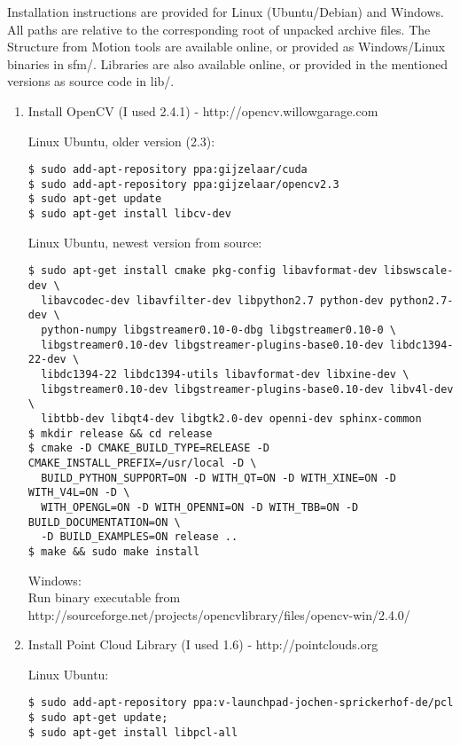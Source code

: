 Installation instructions are provided for Linux (Ubuntu/Debian) and Windows. All paths are relative to the corresponding root of unpacked archive files. The Structure from Motion tools are available online, or provided as Windows/Linux binaries in sfm/. Libraries are also available online, or provided in the mentioned versions as source code in lib/.

\begin{enumerate}
\item Install OpenCV (I used 2.4.1) - http://opencv.willowgarage.com

    Linux Ubuntu, older version (2.3):
    \begin{verbatim}
$ sudo add-apt-repository ppa:gijzelaar/cuda
$ sudo add-apt-repository ppa:gijzelaar/opencv2.3
$ sudo apt-get update
$ sudo apt-get install libcv-dev
    \end{verbatim}

    Linux Ubuntu, newest version from source:
    \begin{verbatim}
$ sudo apt-get install cmake pkg-config libavformat-dev libswscale-dev \
  libavcodec-dev libavfilter-dev libpython2.7 python-dev python2.7-dev \
  python-numpy libgstreamer0.10-0-dbg libgstreamer0.10-0 \
  libgstreamer0.10-dev libgstreamer-plugins-base0.10-dev libdc1394-22-dev \
  libdc1394-22 libdc1394-utils libavformat-dev libxine-dev \
  libgstreamer0.10-dev libgstreamer-plugins-base0.10-dev libv4l-dev \
  libtbb-dev libqt4-dev libgtk2.0-dev openni-dev sphinx-common
$ mkdir release && cd release
$ cmake -D CMAKE_BUILD_TYPE=RELEASE -D CMAKE_INSTALL_PREFIX=/usr/local -D \
  BUILD_PYTHON_SUPPORT=ON -D WITH_QT=ON -D WITH_XINE=ON -D WITH_V4L=ON -D \
  WITH_OPENGL=ON -D WITH_OPENNI=ON -D WITH_TBB=ON -D BUILD_DOCUMENTATION=ON \
  -D BUILD_EXAMPLES=ON release ..
$ make && sudo make install
    \end{verbatim}

    Windows: \\
     Run binary executable from http://sourceforge.net/projects/opencvlibrary/files/opencv-win/2.4.0/


\item Install Point Cloud Library (I used 1.6) - http://pointclouds.org

    Linux Ubuntu:
    \begin{verbatim}
$ sudo add-apt-repository ppa:v-launchpad-jochen-sprickerhof-de/pcl
$ sudo apt-get update;
$ sudo apt-get install libpcl-all
    \end{verbatim}


\end{enumerate}
